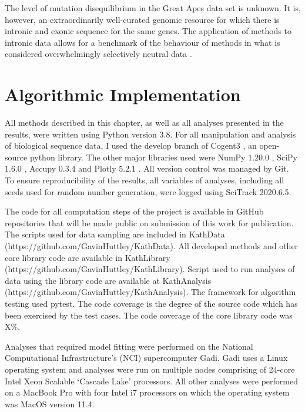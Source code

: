 The level of mutation disequilibrium in the Great Apes data set is unknown. It is, however, an extraordinarily well-curated genomic resource for which there is intronic and exonic sequence for the same genes. The application of methods to intronic data allows for a benchmark of the behaviour of methods in what is considered overwhelmingly selectively neutral data \citep{Graur2013OnENCODE}. 

\section{Algorithmic Implementation}

All methods described in this chapter, as well as all analyses presented in the results, were written using Python version 3.8. For all manipulation and analysis of biological sequence data, I used the develop branch of Cogent3 \citep{huttley_gavin_2021_4542532}, an open-source python library. The other major libraries used were NumPy 1.20.0 \citep{VanDerWalt2011TheComputation}, SciPy 1.6.0 \citep{SciPy2001}, Accupy 0.3.4 \citep{accupy} and Plotly 5.2.1 \citep{plotly}. All version control was managed by Git. To ensure reproducibility of the results, all variables of analyses, including all seeds used for random number generation, were logged using SciTrack 2020.6.5.

The code for all computation steps of the project is available in GitHub repositories that will be made public on submission of this work for publication. The scripts used for data sampling are included in KathData (https://github.com/GavinHuttley/KathData). All developed methods and other core library code are available in KathLibrary (https://github.com/GavinHuttley/KathLibrary). Script used to run analyses of data using the library code are available at KathAnalysis (https://github.com/GavinHuttley/KathAnalysis). The framework for algorithm testing used pytest. The code coverage is the degree of the source code which has been exercised by the test cases. The code coverage of the core library code was X\%. 

Analyses that required model fitting were performed on the National Computational Infrastructure's (NCI) supercomputer Gadi. Gadi uses a Linux operating system and analyses were run on multiple nodes comprising of 24-core Intel Xeon Scalable `Cascade Lake’ processors. All other analyses were performed on a MacBook Pro with four Intel i7 processors on which the  operating system was MacOS version 11.4. 